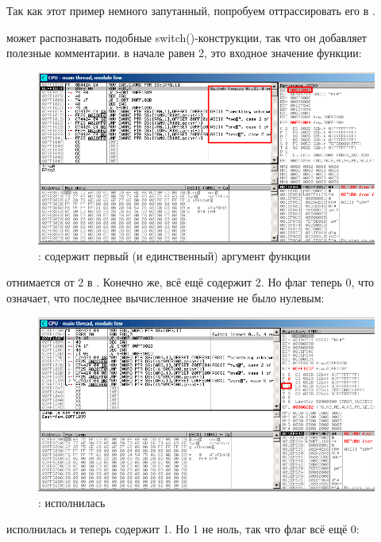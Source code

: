 ﻿\clearpage
\myparagraphold{\olly}

Так как этот пример немного запутанный, попробуем оттрассировать его в \olly.

\olly может распознавать подобные switch()-конструкции, так что он добавляет полезные комментарии.
\EAX в начале равен 2, это входное значение функции: 

\begin{figure}[H]
\centering
\includegraphics[scale=\FigScale]{patterns/08_switch/1_few/olly1.png}
\caption{\olly: \EAX содержит первый (и единственный) аргумент функции}
\label{fig:switch_few_olly1}
\end{figure}

 отнимается от 2 в \EAX. 
Конечно же, \EAX всё ещё содержит 2.
Но флаг \ZF теперь 0, что означает, что последнее вычисленное значение не было нулевым:

\begin{figure}[H]
\centering
\includegraphics[scale=\FigScale]{patterns/08_switch/1_few/olly2.png}
\caption{\olly: \SUB исполнилась}
\label{fig:switch_few_olly2}
\end{figure}

\clearpage
\DEC исполнилась и \EAX теперь содержит 1. 
Но 1 не ноль, так что флаг \ZF всё ещё 0:

